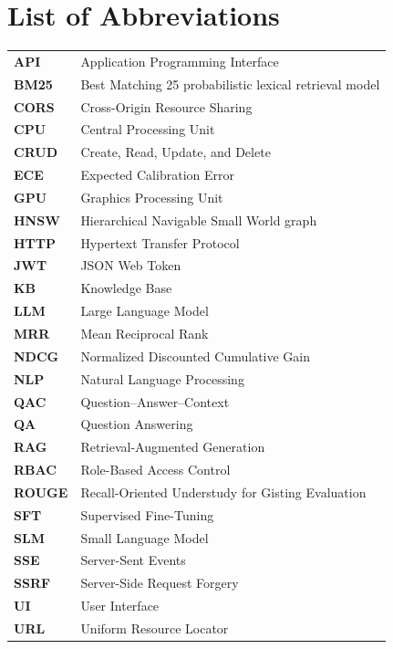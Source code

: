 \chapter*{List of Abbreviations}

\begin{longtable}{>{\bfseries}p{}p{}}
  API & Application Programming Interface\\
  BM25 & Best Matching 25 probabilistic lexical retrieval model\\
  CORS & Cross-Origin Resource Sharing\\
  CPU & Central Processing Unit\\
  CRUD & Create, Read, Update, and Delete\\
  ECE & Expected Calibration Error\\
  GPU & Graphics Processing Unit\\
  HNSW & Hierarchical Navigable Small World graph\\
  HTTP & Hypertext Transfer Protocol\\
  JWT & JSON Web Token\\
  KB & Knowledge Base\\
  LLM & Large Language Model\\
  MRR & Mean Reciprocal Rank\\
  NDCG & Normalized Discounted Cumulative Gain\\
  NLP & Natural Language Processing\\
  QAC & Question--Answer--Context\\
  QA & Question Answering\\
  RAG & Retrieval-Augmented Generation\\
  RBAC & Role-Based Access Control\\
  ROUGE & Recall-Oriented Understudy for Gisting Evaluation\\
  SFT & Supervised Fine-Tuning\\
  SLM & Small Language Model\\
  SSE & Server-Sent Events\\
  SSRF & Server-Side Request Forgery\\
  UI & User Interface\\
  URL & Uniform Resource Locator\\
\end{longtable}

